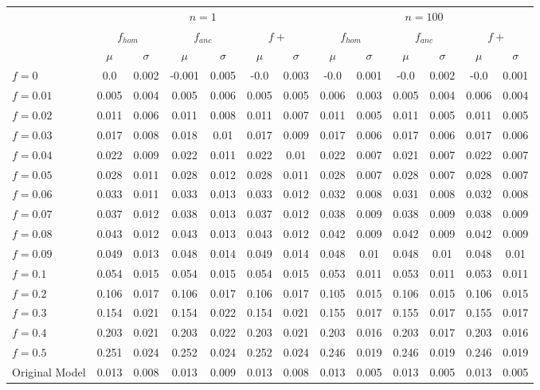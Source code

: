 \begin{tabular}{@{}lcccccccccccc@{}}
\toprule
 & \multicolumn{6}{c}{$n=1$} & \multicolumn{6}{c}{$n=100$} \\
\cmidrule(lr){2-7} \cmidrule(lr){8-13}
 & \multicolumn{2}{c}{$f_{hom}$} & \multicolumn{2}{c}{$f_{anc}$} & \multicolumn{2}{c}{$f+$} & \multicolumn{2}{c}{$f_{hom}$} & \multicolumn{2}{c}{$f_{anc}$} & \multicolumn{2}{c}{$f+$} \\
\cmidrule(lr){2-3} \cmidrule(lr){4-5} \cmidrule(lr){6-7} \cmidrule(lr){8-9} \cmidrule(lr){10-11} \cmidrule(lr){12-13}
 & $\mu$ & $\sigma$ & $\mu$ & $\sigma$ & $\mu$ & $\sigma$ & $\mu$ & $\sigma$ & $\mu$ & $\sigma$ & $\mu$ & $\sigma$ \\
\midrule
$f = 0$ & 0.0 & 0.002 & -0.001 & 0.005 & -0.0 & 0.003 & -0.0 & 0.001 & -0.0 & 0.002 & -0.0 & 0.001 \\
$f = 0.01$ & 0.005 & 0.004 & 0.005 & 0.006 & 0.005 & 0.005 & 0.006 & 0.003 & 0.005 & 0.004 & 0.006 & 0.004 \\
$f = 0.02$ & 0.011 & 0.006 & 0.011 & 0.008 & 0.011 & 0.007 & 0.011 & 0.005 & 0.011 & 0.005 & 0.011 & 0.005 \\
$f = 0.03$ & 0.017 & 0.008 & 0.018 & 0.01 & 0.017 & 0.009 & 0.017 & 0.006 & 0.017 & 0.006 & 0.017 & 0.006 \\
$f = 0.04$ & 0.022 & 0.009 & 0.022 & 0.011 & 0.022 & 0.01 & 0.022 & 0.007 & 0.021 & 0.007 & 0.022 & 0.007 \\
$f = 0.05$ & 0.028 & 0.011 & 0.028 & 0.012 & 0.028 & 0.011 & 0.028 & 0.007 & 0.028 & 0.007 & 0.028 & 0.007 \\
$f = 0.06$ & 0.033 & 0.011 & 0.033 & 0.013 & 0.033 & 0.012 & 0.032 & 0.008 & 0.031 & 0.008 & 0.032 & 0.008 \\
$f = 0.07$ & 0.037 & 0.012 & 0.038 & 0.013 & 0.037 & 0.012 & 0.038 & 0.009 & 0.038 & 0.009 & 0.038 & 0.009 \\
$f = 0.08$ & 0.043 & 0.012 & 0.043 & 0.013 & 0.043 & 0.012 & 0.042 & 0.009 & 0.042 & 0.009 & 0.042 & 0.009 \\
$f = 0.09$ & 0.049 & 0.013 & 0.048 & 0.014 & 0.049 & 0.014 & 0.048 & 0.01 & 0.048 & 0.01 & 0.048 & 0.01 \\
$f = 0.1$ & 0.054 & 0.015 & 0.054 & 0.015 & 0.054 & 0.015 & 0.053 & 0.011 & 0.053 & 0.011 & 0.053 & 0.011 \\
$f = 0.2$ & 0.106 & 0.017 & 0.106 & 0.017 & 0.106 & 0.017 & 0.105 & 0.015 & 0.106 & 0.015 & 0.106 & 0.015 \\
$f = 0.3$ & 0.154 & 0.021 & 0.154 & 0.022 & 0.154 & 0.021 & 0.155 & 0.017 & 0.155 & 0.017 & 0.155 & 0.017 \\
$f = 0.4$ & 0.203 & 0.021 & 0.203 & 0.022 & 0.203 & 0.021 & 0.203 & 0.016 & 0.203 & 0.017 & 0.203 & 0.016 \\
$f = 0.5$ & 0.251 & 0.024 & 0.252 & 0.024 & 0.252 & 0.024 & 0.246 & 0.019 & 0.246 & 0.019 & 0.246 & 0.019 \\
Original Model & 0.013 & 0.008 & 0.013 & 0.009 & 0.013 & 0.008 & 0.013 & 0.005 & 0.013 & 0.005 & 0.013 & 0.005 \\
\bottomrule
\end{tabular}
